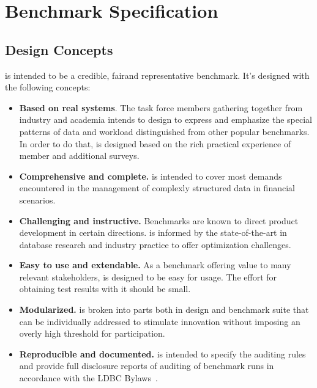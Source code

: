 \chapter{Benchmark Specification}
\label{sec:benchmark-specification}

\section{Design Concepts}

\ldbcfinbench is intended to be a credible, fairand representative benchmark.
It's designed with the following concepts:

\begin{itemize}
      \item \textbf{Based on real systems}. The task force members gathering
            together from industry and academia intends to design \ldbcfinbench
            to express and emphasize the special patterns of data and workload
            distinguished from other popular benchmarks. In order to do that,
            \ldbcfinbench is designed based on the rich practical experience of
            member and additional surveys.
      \item \textbf{Comprehensive and complete.} \ldbcfinbench is intended to
            cover most demands encountered in the management of complexly
            structured data in financial scenarios.
      \item \textbf{Challenging and instructive.} Benchmarks are known to direct
            product development in certain directions. \ldbcfinbench is informed
            by the state-of-the-art in database research and industry practice
            to offer optimization challenges.
      \item \textbf{Easy to use and extendable.} As a benchmark offering value
            to many relevant stakeholders, \ldbcfinbench is designed to be easy
            for usage. The effort for obtaining test results with it should be
            small.
      \item \textbf{Modularized.} \ldbcfinbench is broken into parts both in
            design and benchmark suite that can be individually addressed to
            stimulate innovation without imposing an overly high threshold for
            participation.
      \item \textbf{Reproducible and documented.} \ldbcfinbench is intended to
            specify the auditing rules and provide full disclosure reports of
            auditing of benchmark runs in accordance with the LDBC
            Bylaws~\cite{ldbc_byelaws}.
\end{itemize}

